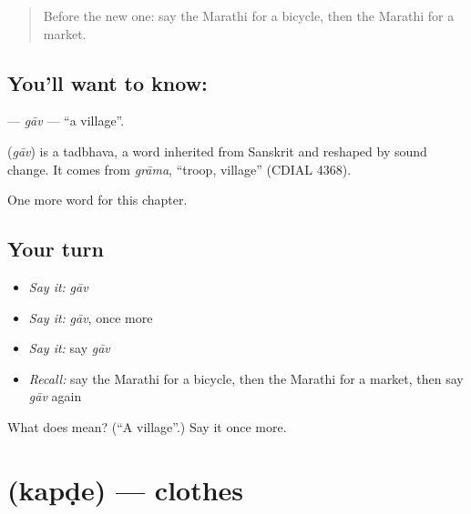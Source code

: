 \label{lesson:MR-C115-gav}



\begin{quote}
Before the new one: say the Marathi for a bicycle, then the Marathi for a market.
\end{quote}

\subsection*{You'll want to know: }
\textbf{} — \emph{gāv} — \textquotedblleft{}a village\textquotedblright{}.

\begin{cousinweb}
\textbf{} (\emph{gāv}) is a tadbhava, a word inherited from Sanskrit and reshaped by sound change. It comes from \emph{grāma}, \textquotedblleft{}troop, village\textquotedblright{} (CDIAL 4368).
\end{cousinweb}

\begin{grammarlens}[title={What you've built}]
One more word for this chapter.
\end{grammarlens}

\subsection*{Your turn}
\begin{itemize}
\raggedright
  \item \emph{Say it:} \emph{gāv}
  \item \emph{Say it:} \emph{gāv}, once more
  \item \emph{Say it:} say \emph{gāv}
  \item \emph{Recall:} say the Marathi for a bicycle, then the Marathi for a market, then say \emph{gāv} again
\end{itemize}

\begin{tcolorbox}[breakable,colback=teal!4,colframe=teal!35!black,title={Before you move on}]
What does  mean? (\textquotedblleft{}A village\textquotedblright{}.) Say it once more.
\end{tcolorbox}
\section[\texorpdfstring{\mr{कपडे} (kapḍe)}{कपडे (kapḍe)}]{ (kapḍe) — clothes}

\label{lesson:MR-C115-kapde}



